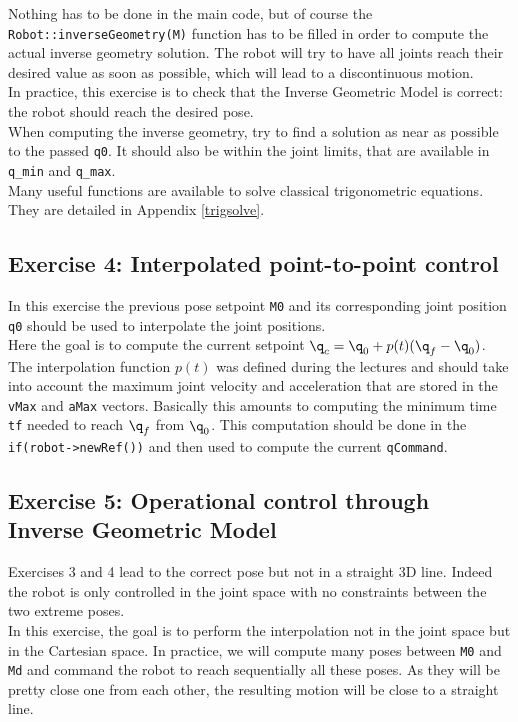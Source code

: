 \documentclass{ecnreport}
\begin{document}
Nothing has to be done in the main code, but of course the \texttt{Robot::inverseGeometry(M)} function has to be filled in order to compute the actual inverse geometry solution. The robot will try to have all joints reach their desired value as soon as possible, which will lead to a discontinuous motion.\\

In practice, this exercise is to check that the Inverse Geometric Model is correct: the robot should reach the desired pose.\\

When computing the inverse geometry, try to find a solution as near as possible to the passed \texttt{q0}. It should also be within the joint limits, that are available in \texttt{q\_min} and \texttt{q\_max}.\\

Many useful functions are available to solve classical trigonometric equations. They are detailed in Appendix \ref{trigsolve}.

\subsection*{Exercise 4: Interpolated point-to-point control}

In this exercise the previous pose setpoint \texttt{M0} and its corresponding joint position \texttt{q0} should be used to interpolate the joint positions.\\

Here the goal is to compute the current setpoint $\q_c = \q_0 + p(t)(\q_f-\q_0)$. The interpolation function $p(t)$ was defined during the lectures and should take into account the maximum joint velocity and acceleration that are stored in the \texttt{vMax} and \texttt{aMax} vectors. Basically this amounts to computing the minimum time \texttt{tf} needed to reach $\q_f$ from $\q_0$. This computation should be done in the \texttt{if(robot->newRef())} and then used to compute the current \texttt{qCommand}.


\subsection*{Exercise 5: Operational control through Inverse Geometric Model}

Exercises 3 and 4 lead to the correct pose but not in a straight 3D line. Indeed the robot is only controlled in the joint space with no constraints between the two extreme poses.\\
In this exercise, the goal is to perform the interpolation not in the joint space but in the Cartesian space. In practice, we will compute many poses between 
\texttt{M0} and \texttt{Md} and command the robot to reach sequentially all these poses. As they will be pretty close one from each other, the resulting motion 
will be close to a straight line.
\end{document}
